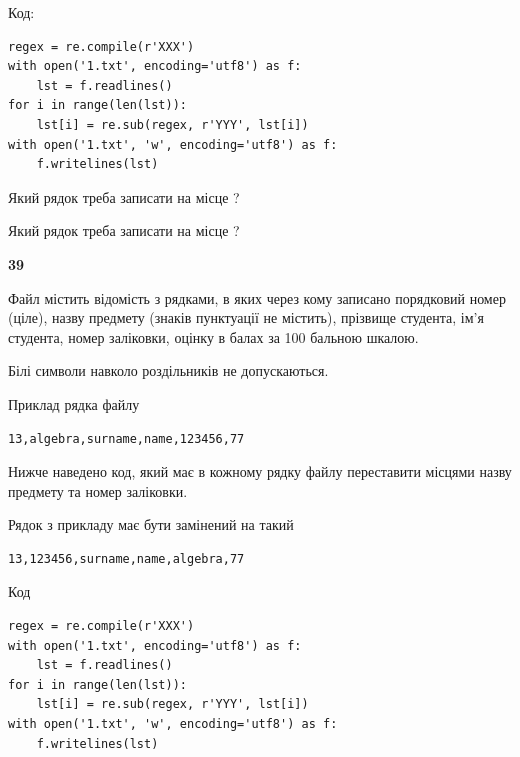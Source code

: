 Код:



\begin{verbatim}
regex = re.compile(r'XXX')
with open('1.txt', encoding='utf8') as f:
    lst = f.readlines()
for i in range(len(lst)):
    lst[i] = re.sub(regex, r'YYY', lst[i])
with open('1.txt', 'w', encoding='utf8') as f:
    f.writelines(lst)
\end{verbatim}







Який рядок треба записати на місце  ?\par
\vspace{5mm}


Який рядок треба записати на місце  ?\par


\newpage

{\begin {center}\textbf{ 39}\end {center}}\par
Файл  містить відомість з рядками, в яких через кому записано поряд\-ковий номер (ціле), назву предмету (знаків пунктуації не містить), прізвище студента, ім'я студента, номер заліковки, оцінку в балах за 100 бальною шкалою.

Білі символи навколо роздільників не допускаються.

Приклад рядка файлу



\begin{verbatim}
13,algebra,surname,name,123456,77
\end{verbatim}


Нижче наведено код, який має в кожному рядку файлу переставити місцями назву предмету та номер заліковки.

Рядок з прикладу має бути замінений на такий



\begin{verbatim}
13,123456,surname,name,algebra,77
\end{verbatim}




Код



\begin{verbatim}
regex = re.compile(r'XXX')
with open('1.txt', encoding='utf8') as f:
    lst = f.readlines()
for i in range(len(lst)):
    lst[i] = re.sub(regex, r'YYY', lst[i])
with open('1.txt', 'w', encoding='utf8') as f:
    f.writelines(lst)
\end{verbatim}







